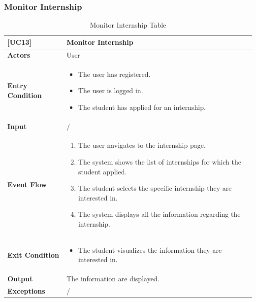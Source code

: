\subsubsection*{Monitor Internship}
\begin{table}[H]
    \centering
    \renewcommand{\arraystretch}{1.5}
    \begin{tabular}{|p{4cm}|p{11cm}|}
    \hline
    \rowcolor{bluepoli!40}
    \textbf{[UC13]} & \textbf{Monitor Internship} \\ \hline \hline
    \textbf{Actors} & User \\ \hline
    \textbf{Entry Condition} & 
    {\setlength{\leftmargini}{1.1em}
    \begin{itemize}
        \item The user has registered.
        \item The user is logged in.
        \item The student has applied for an internship.
    \end{itemize}} \\ \hline
    \textbf{Input} & / \\ \hline
    \textbf{Event Flow} & 
    {\setlength{\leftmargini}{1.4em}
    \begin{enumerate}
        \item The user navigates to the internship page.
        \item The system shows the list of internships for which the student applied.
        \item The student selects the specific internship they are interested in.
        \item The system displays all the information regarding the internship.
    \end{enumerate}} \\ \hline
    \textbf{Exit Condition} & 
    {\setlength{\leftmargini}{1.1em}
    \begin{itemize}
        \item The student visualizes the information they are interested in.
    \end{itemize}} \\ \hline
    \textbf{Output} & 
    The information are displayed.\\ \hline
    \textbf{Exceptions} & / \\ \hline
    \end{tabular}
    \caption{Monitor Internship Table}
\end{table}

